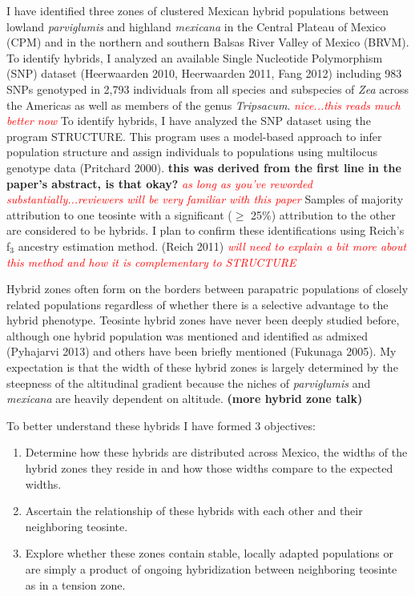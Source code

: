\documentclass[12pt]{amsart}
\newcommand{\mbh}[1]{\textcolor{red}{ \emph{\scriptsize  #1}} }
\begin{document}
I have identified three zones of clustered Mexican hybrid populations between lowland \textit{parviglumis} and highland \textit{mexicana} in the Central Plateau of Mexico (CPM) and in the northern and southern Balsas River Valley of Mexico (BRVM). 
To identify hybrids, I analyzed an available Single Nucleotide Polymorphism (SNP) dataset  (Heerwaarden 2010, Heerwaarden 2011, Fang 2012) including 983 SNPs genotyped in 2,793 individuals from all species and subspecies of \textit{Zea} across the Americas as well as members of the genus \textit{Tripsacum}.  \mbh{nice...this reads much better now}
To identify hybrids, I have analyzed the SNP dataset using the program STRUCTURE.
This program uses a model-based approach to infer population structure and assign individuals to populations using multilocus genotype data (Pritchard 2000). \textbf{this was derived from the first line in the paper's abstract, is that okay?} \mbh{as long as you've reworded substantially...reviewers will be very familiar with this paper}
Samples of majority attribution to one teosinte with a significant ($\geq$ 25\%) attribution to the other are considered to be hybrids.
I plan to confirm these identifications using Reich's f$_{\text{3}}$ ancestry estimation method. (Reich  2011)\mbh{will need to explain a bit more about this method and how it is complementary to STRUCTURE}


Hybrid zones often form on the borders between parapatric populations of closely related populations regardless of whether there is a selective advantage to the hybrid phenotype.
Teosinte hybrid zones have never been deeply studied before, although one hybrid population was mentioned and identified as admixed (Pyhajarvi 2013)  and others have been briefly mentioned (Fukunaga 2005).
My expectation is that the width of these hybrid zones is largely determined by the steepness of the altitudinal gradient because the niches of \textit{parviglumis} and \textit{mexicana} are heavily dependent on altitude.
 \textbf{(more hybrid zone talk)} 


To better understand these hybrids I have formed 3 objectives: 
\begin{enumerate} 
	\item Determine how these hybrids are distributed across Mexico, the widths of the hybrid zones they reside in and how those widths compare to the expected widths.
	\item Ascertain the relationship of these hybrids with each other and their neighboring teosinte.
	\item Explore whether these zones contain stable, locally adapted populations or are simply a product of ongoing hybridization between neighboring teosinte as in a tension zone.
\end{enumerate} 
\end{document}
